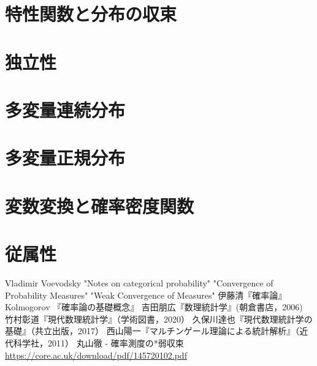 \documentclass[uplatex,dvipdfmx]{jsreport}
\begin{document}
\section{特性関数と分布の収束}

\section{独立性}

\section{多変量連続分布}

\section{多変量正規分布}

\section{変数変換と確率密度関数}

\section{従属性}





\begin{thebibliography}{99}
    Vladimir Voevodsky "Notes on categorical probability"
    "Convergence of Probability Measures"
    "Weak Convergence of Measures"
    伊藤清『確率論』
    Kolmogorov 『確率論の基礎概念』
    吉田朋広『数理統計学』(朝倉書店，2006)
    竹村彰道『現代数理統計学』（学術図書，2020）
    久保川達也『現代数理統計学の基礎』（共立出版，2017）
    西山陽一『マルチンゲール理論による統計解析』（近代科学社，2011）
    丸山徹 - 確率測度の*弱収束\url{https://core.ac.uk/download/pdf/145720102.pdf}
\end{thebibliography}
\end{document}
